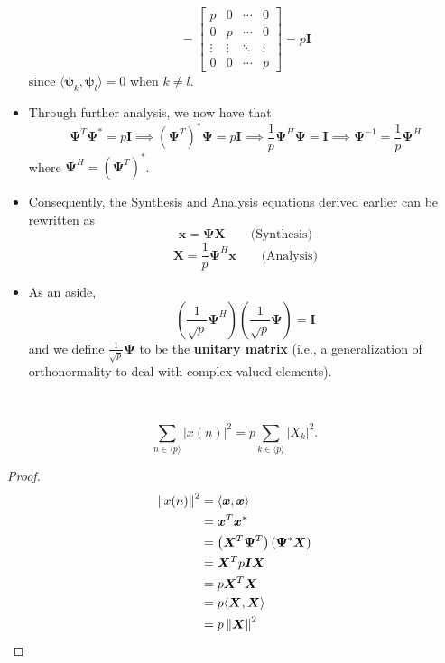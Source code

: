 \begin{itemize}
\[		      =
		      \begin{bmatrix}
			      p      & 0      & \cdots & 0      \\
			      0      & p      & \cdots & 0      \\
			      \vdots & \vdots & \ddots & \vdots \\
			      0      & 0      & \cdots & p
		      \end{bmatrix} = p \bm{I}
	      \]
	      since $\langle \bm{\psi}_{k}, \bm{\psi}_{l} \rangle = 0$ when $k \neq l$.
	\item Through further analysis, we now have that
	      \[
		      \bm{\Psi}^T \bm{\Psi}^* = p\bm{I} \implies \left(\bm{\Psi}^T\right)^* \bm{\Psi} = p\bm{I}
		      \implies \frac{1}{p}\bm{\Psi}^H\bm{\Psi} = \bm{I} \implies \bm{\Psi}^{-1} = \frac{1}{p}\bm{\Psi}^H
	      \]
	      where $\bm{\Psi}^H = \left(\bm{\Psi}^T\right)^*$.
	\item Consequently, the Synthesis and Analysis equations
	      derived earlier can be rewritten as
	      \begin{equation}
		      \bm{x} = \bm{\Psi} \bm{X} \qquad \text{(Synthesis)}
	      \end{equation}
	      \begin{equation}
		      \bm{X} = \frac{1}{p}\bm{\Psi}^{H} \bm{x} \qquad \text{(Analysis)}
	      \end{equation}
	\item As an aside,
	      \[
		      \left( \frac{1}{\sqrt{p}} \bm{\Psi}^H \right)
		      \left( \frac{1}{\sqrt{p}}\bm{\Psi} \right) = \bm{I}
	      \]
	      and we define $\frac{1}{\sqrt{p}}\bm{\Psi}$ to be the \textbf{unitary matrix} (i.e.,
	      a generalization of orthonormality to deal with complex valued elements).
\end{itemize}
\begin{theorem}~

	\[
		\sum_{n \in \langle p \rangle} \left| x(n) \right|^2 = p \sum_{k \in \langle p \rangle} \left| X_{k} \right|^2
		.\]
\end{theorem}
\begin{proof}
	\begin{align*}
		\left\lVert x(n) \right\rVert^2 & = \langle \bm{x}, \bm{x} \rangle                                        \\
		                                & = \bm{x}^T \bm{x}^*                                                     \\
		                                & = \left( \bm{X}^T \bm{\Psi}^T \right) \left( \bm{\Psi}^* \bm{X} \right) \\
		                                & = \bm{X}^T p \bm{I} \bm{X}                                              \\
		                                & = p \bm{X}^T \bm{X}                                                     \\
		                                & = p \langle \bm{X}, \bm{X} \rangle                                      \\
		                                & = p \left\lVert \bm{X} \right\rVert^2 \qedhere
	\end{align*}
\end{proof}
